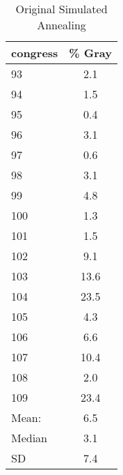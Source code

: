\documentclass[12pt]{article}
\begin{document}
	
	\begin{table}[ht]
		\centering
		\caption{Original Simulated Annealing}
		\begin{tabular}{l c}
			\hline
			congress & \% Gray \\ 
			\hline
			93 & 2.1 \\ 
			94 & 1.5 \\ 
			95 & 0.4 \\ 
			96 & 3.1 \\ 
			97 & 0.6 \\ 
			98 & 3.1 \\ 
			99 & 4.8 \\ 
			100 & 1.3 \\ 
			101 & 1.5 \\ 
			102 & 9.1 \\ 
			103 & 13.6 \\ 
			104 & 23.5 \\ 
			105 & 4.3 \\ 
			106 & 6.6 \\ 
			107 & 10.4 \\ 
			108 & 2.0 \\ 
			109 & 23.4 \\ 
			\hline
			Mean: & 6.5 \\
			Median & 3.1 \\
			SD & 7.4 \\
			\hline
		\end{tabular}
	\end{table}
	
\end{document}
